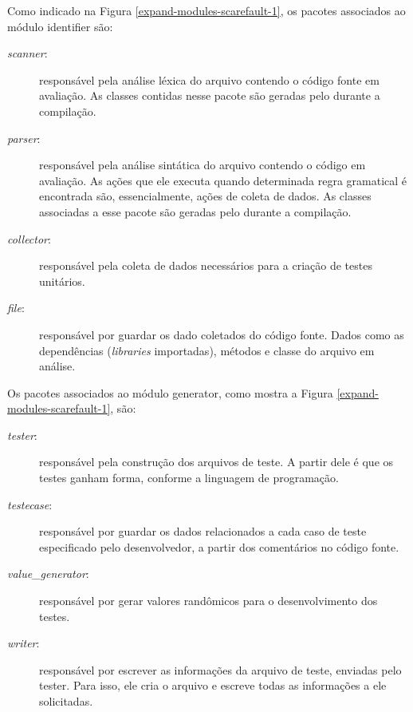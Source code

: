 Como indicado na Figura \ref{expand-modules-scarefault-1}, os pacotes associados ao
módulo \textsf{identifier} são:
\begin{description}
\item[\textit{scanner}:] responsável pela análise léxica do arquivo contendo o código
fonte em avaliação. As classes contidas nesse pacote são geradas pelo \flexcpp durante
a compilação.
\item[\textit{parser}:] responsável pela análise sintática do arquivo contendo o
código em avaliação. As ações que ele executa quando determinada regra gramatical é
encontrada são, essencialmente, ações de coleta de dados. As classes associadas
a esse pacote são geradas pelo \bisoncpp durante a compilação.
\item[\textit{collector}:] responsável pela coleta de dados necessários para a
criação de testes unitários.
\item[\textit{file}:] responsável por guardar os dado coletados do código fonte.
Dados como as dependências (\textit{libraries} importadas), métodos e classe
do arquivo em análise.
\end{description}

Os pacotes associados ao módulo \textsf{generator}, como mostra a Figura
\ref{expand-modules-scarefault-1}, são:
\begin{description}
\item[	\textit{tester}:] responsável pela construção dos arquivos de teste. A partir
dele é que os testes ganham forma, conforme a linguagem de programação.
\item[	\textit{testecase}:] responsável por guardar os dados relacionados
a cada caso de teste especificado pelo desenvolvedor, a partir dos
comentários no código fonte.
\item[	\textit{value\_generator}:] responsável por gerar valores randômicos
para o desenvolvimento dos testes.
\item[\textit{writer}:] responsável por escrever as informações da arquivo de
teste, enviadas pelo \textsf{tester}. Para isso, ele cria o arquivo e
escreve todas as informações a ele solicitadas.
\end{description}

